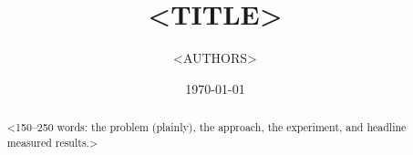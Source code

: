 \documentclass[11pt]{article}
\title{\textbf{<TITLE>}}
\author{<AUTHORS>}
\date{\today}
\begin{document}
\maketitle

\begin{abstract}
<150--250 words: the problem (plainly), the approach, the experiment, and
headline measured results.>
\end{abstract}










\end{document}
